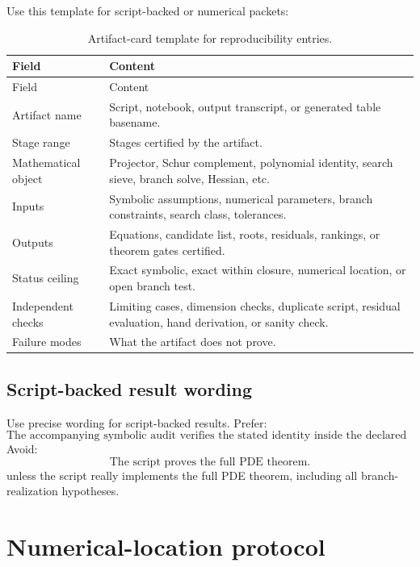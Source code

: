 Use this template for script-backed or numerical packets:

\begin{longtable}{@{}L{0.23\textwidth}L{0.67\textwidth}@{}}
\caption{Artifact-card template for reproducibility entries.}\label{tab:artifact-card-fill-template}\\
\toprule
Field & Content \\
\midrule
\endfirsthead
\toprule
Field & Content \\
\midrule
\endhead
Artifact name & Script, notebook, output transcript, or generated table basename. \\
\addlinespace
Stage range & Stages certified by the artifact. \\
\addlinespace
Mathematical object & Projector, Schur complement, polynomial identity, search sieve, branch solve, Hessian, etc. \\
\addlinespace
Inputs & Symbolic assumptions, numerical parameters, branch constraints, search class, tolerances. \\
\addlinespace
Outputs & Equations, candidate list, roots, residuals, rankings, or theorem gates certified. \\
\addlinespace
Status ceiling & Exact symbolic, exact within closure, numerical location, or open branch test. \\
\addlinespace
Independent checks & Limiting cases, dimension checks, duplicate script, residual evaluation, hand derivation, or sanity check. \\
\addlinespace
Failure modes & What the artifact does not prove. \\
\bottomrule
\end{longtable}

\subsection{Script-backed result wording}
\label{subsec:script-backed-result-wording}

Use precise wording for script-backed results.  Prefer:
\[
\text{The accompanying symbolic audit verifies the stated identity inside the declared finite model.}
\]
Avoid:
\[
\text{The script proves the full PDE theorem.}
\]
unless the script really implements the full PDE theorem, including all branch-realization hypotheses.

\section{Numerical-location protocol}
\label{sec:numerical-location-protocol}

